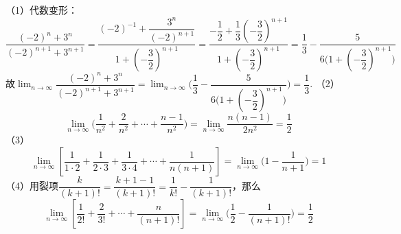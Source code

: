 \begin{solution}
    （1）代数变形：
    \[\displaystyle\dfrac{(-2)^n+3^n}{(-2)^{n+1}+3^{n+1}}=\dfrac{(-2)^{-1}+\dfrac{3^n}{(-2)^{n+1}}}{1+(-\dfrac32)^{n+1}}=\dfrac{-\dfrac12+\dfrac13(-\dfrac32)^{n+1}}{1+(-\dfrac32)^{n+1}}=\dfrac13-\dfrac{5}{6\bigg(1+(-\dfrac32)^{n+1}\bigg)}\]
    故$\displaystyle\lim_{n\to\infty}\dfrac{(-2)^n+3^n}{(-2)^{n+1}+3^{n+1}}=\lim_{n\to\infty}\bigg(\dfrac13-\dfrac{5}{6\bigg(1+(-\dfrac32)^{n+1}\bigg)}\bigg)=\dfrac13$.\newline
    （2）\[\lim_{n\to\infty}\bigg(\dfrac{1}{n^2}+\dfrac{2}{n^2}+\cdots+\dfrac{n-1}{n^2}\bigg)=\lim_{n\to\infty}\dfrac{n(n-1)}{2n^2}=\dfrac12\]
    （3）\[\displaystyle\lim_{n\to\infty}\left[\dfrac{1}{1\cdot 2}+\dfrac{1}{2\cdot3}+\dfrac{1}{3\cdot4}+\cdots+\dfrac{1}{n(n+1)}\right]=\lim_{n\to\infty}\bigg(1-\dfrac{1}{n+1}\bigg)=1\]
    （4）用裂项$\dfrac{k}{(k+1)!}=\dfrac{k+1-1}{(k+1)!}=\dfrac{1}{k!}-\dfrac{1}{(k+1)!}$，那么
    \[\displaystyle\lim_{n\to\infty}\left[\dfrac{1}{2!}+\dfrac{2}{3!}+\cdots+\dfrac{n}{(n+1)!}\right]=\lim_{n\to\infty}\bigg(\dfrac12-\dfrac{1}{(n+1)!}\bigg)=\dfrac12\]
\end{solution}

